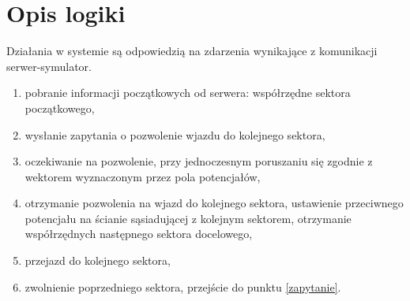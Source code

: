 \section{Opis logiki}

Działania w systemie są odpowiedzią na zdarzenia wynikające z komunikacji serwer-symulator.

\begin{enumerate}
  \item pobranie informacji początkowych od serwera: współrzędne
    sektora początkowego,

  \item wysłanie zapytania o pozwolenie wjazdu do kolejnego
    sektora, \label{zapytanie}

  \item oczekiwanie na pozwolenie, przy jednoczesnym poruszaniu się
    zgodnie z wektorem wyznaczonym przez pola potencjałów,
    
  \item otrzymanie pozwolenia na wjazd do kolejnego sektora,
    ustawienie przeciwnego potencjału na ścianie sąsiadującej z
    kolejnym sektorem, otrzymanie współrzędnych następnego sektora
    docelowego,

  \item przejazd do kolejnego sektora,

  \item zwolnienie poprzedniego sektora, przejście do punktu \ref{zapytanie}.

\end{enumerate}




